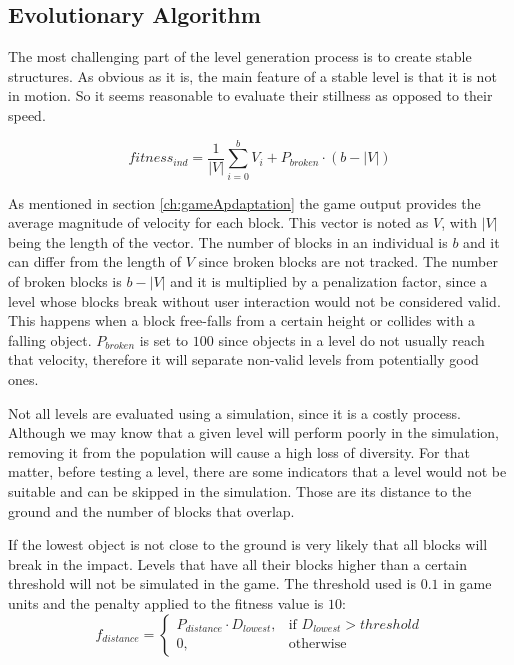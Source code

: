 \subsection{Evolutionary Algorithm}\label{ch:Representation}

The most challenging part of the level generation process is to create stable structures. As obvious as it is, the main feature of a stable level is that it is not in motion. So it seems reasonable to evaluate their stillness as opposed to their speed.

$$fitness_{ind} = \frac{1}{|V|}\sum_{i=0}^{b}{V_i} + P_{broken}\cdot(b-|V|)$$

As mentioned in section \ref{ch:gameApdaptation} the game output provides the average magnitude of velocity for each block. This vector is noted as $V$, with $|V|$ being the length of the vector. The number of blocks in an individual is $b$ and it can differ from the length of $V$ since broken blocks are not tracked. The number of broken blocks is $b-|V|$ and it is multiplied by a penalization factor, since a level whose blocks break without user interaction would not be considered valid. This happens when a block free-falls from a certain height or collides with a falling object. $P_{broken}$ is set to $100$ since objects in a level do not usually reach that velocity, therefore it will separate non-valid levels from potentially good ones.

  

Not all levels are evaluated using a simulation, since it is a costly process. Although we may know that a given level will perform poorly in the simulation, removing it from the population will cause a high loss of diversity. For that matter, before testing a level, there are some indicators that a level would not be suitable and can be skipped in the simulation. Those are its distance to the ground and the number of blocks that overlap.

If the lowest object is not close to the ground is very likely that all blocks will break in the impact. Levels that have all their blocks higher than a certain threshold will not be simulated in the game. The threshold used is $0.1$ in game units and the penalty applied to the fitness value is $10$:
$$f_{distance} = 
\begin{cases}
	P_{distance}\cdot D_{lowest}, & \text{if } D_{lowest} > threshold\\
	0, & \text{otherwise}
\end{cases}
 $$


